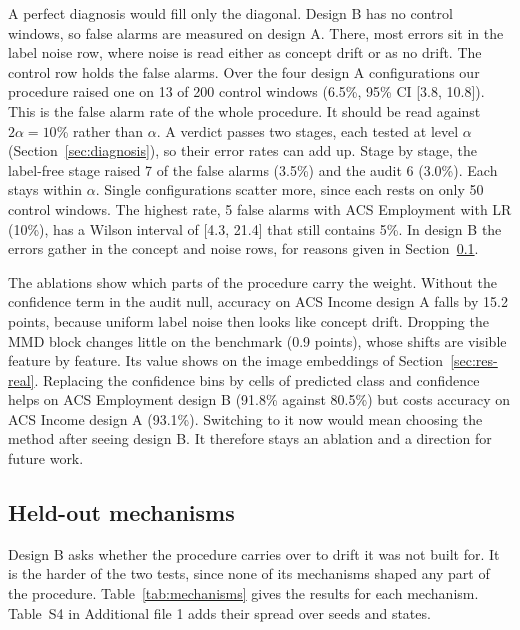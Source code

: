 \documentclass[pdflatex,referee,lineno,sn-basic]{sn-jnl}
\begin{document}
A perfect diagnosis would fill only the diagonal. Design B has no control windows, so false alarms are measured on design A. There, most errors sit in the label noise row, where noise is read either as concept drift or as no drift. The control row holds the false alarms. Over the four design A configurations our procedure raised one on 13 of 200 control windows (6.5\%, 95\% CI [3.8, 10.8]). This is the false alarm rate of the whole procedure. It should be read against $2\alpha=10$\% rather than $\alpha$. A verdict passes two stages, each tested at level $\alpha$ (Section~\ref{sec:diagnosis}), so their error rates can add up. Stage by stage, the label-free stage raised 7 of the false alarms (3.5\%) and the audit 6 (3.0\%). Each stays within $\alpha$. Single configurations scatter more, since each rests on only 50 control windows. The highest rate, 5 false alarms with ACS Employment with LR (10\%), has a Wilson interval of [4.3, 21.4] that still contains 5\%. In design B the errors gather in the concept and noise rows, for reasons given in Section~\ref{sec:res-mechanisms}.

The ablations show which parts of the procedure carry the weight. Without the confidence term in the audit null, accuracy on ACS Income design A falls by 15.2 points, because uniform label noise then looks like concept drift. Dropping the MMD block changes little on the benchmark (\textminus{}0.9 points), whose shifts are visible feature by feature. Its value shows on the image embeddings of Section~\ref{sec:res-real}. Replacing the confidence bins by cells of predicted class and confidence helps on ACS Employment design B (91.8\% against 80.5\%) but costs accuracy on ACS Income design A (93.1\%). Switching to it now would mean choosing the method after seeing design B. It therefore stays an ablation and a direction for future work.

\subsection{Held-out mechanisms}\label{sec:res-mechanisms}

Design B asks whether the procedure carries over to drift it was not built for. It is the harder of the two tests, since none of its mechanisms shaped any part of the procedure. Table~\ref{tab:mechanisms} gives the results for each mechanism. Table~S4 in Additional file 1 adds their spread over seeds and states.
\end{document}
